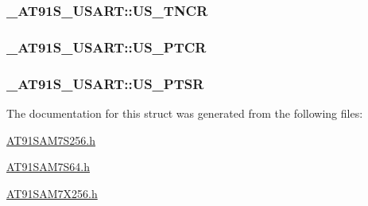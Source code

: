 \hypertarget{struct__AT91S__USART_c561ac4ef04fa503459b5b7a4b393fa9}{
\subsubsection{ {\bf \_\-AT91S\_\-USART::US\_\-TNCR}}}
\label{struct__AT91S__USART_c561ac4ef04fa503459b5b7a4b393fa9}


\hypertarget{struct__AT91S__USART_34f5675243d34c85da1c4e870f0654aa}{
\subsubsection{ {\bf \_\-AT91S\_\-USART::US\_\-PTCR}}}
\label{struct__AT91S__USART_34f5675243d34c85da1c4e870f0654aa}


\hypertarget{struct__AT91S__USART_55b19ad696b4ded0785eb1409da2b4c2}{
\subsubsection{ {\bf \_\-AT91S\_\-USART::US\_\-PTSR}}}
\label{struct__AT91S__USART_55b19ad696b4ded0785eb1409da2b4c2}




The documentation for this struct was generated from the following files:\begin{CompactItemize}
\item 
\hyperlink{AT91SAM7S256_8h}{AT91SAM7S256.h}\item 
\hyperlink{AT91SAM7S64_8h}{AT91SAM7S64.h}\item 
\hyperlink{AT91SAM7X256_8h}{AT91SAM7X256.h}\end{CompactItemize}
